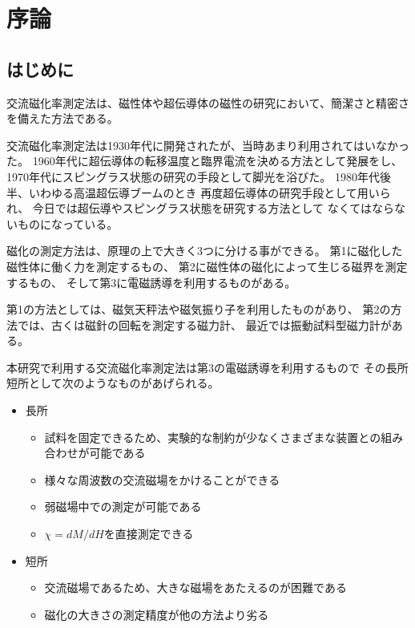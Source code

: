 \chapter{序論}\label{ch:joron}

\section{はじめに}\label{sec:hajimeni}
交流磁化率測定法は、磁性体や超伝導体の磁性の研究において、簡潔さと精密さを備えた方法である。

交流磁化率測定法は1930年代に開発されたが、当時あまり利用されてはいなかった。
1960年代に超伝導体の転移温度と臨界電流を決める方法として発展をし、
1970年代にスピングラス状態の研究の手段として脚光を浴びた。
1980年代後半、いわゆる高温超伝導ブームのとき
再度超伝導体の研究手段として用いられ、
今日では超伝導やスピングラス状態を研究する方法として
なくてはならないものになっている。

磁化の測定方法は、原理の上で大きく3つに分ける事ができる。
第1に磁化した磁性体に働く力を測定するもの、
第2に磁性体の磁化によって生じる磁界を測定するもの、
そして第3に電磁誘導を利用するものがある。

第1の方法としては、磁気天秤法や磁気振り子を利用したものがあり、
第2の方法では、古くは磁針の回転を測定する磁力計、
最近では振動試料型磁力計がある。

本研究で利用する交流磁化率測定法は第3の電磁誘導を利用するもので
その長所短所として次のようなものがあげられる。

\begin{itemize}
 \item 長所
  \begin{itemize}
    \item 試料を固定できるため、実験的な制約が少なくさまざまな装置との組み合わせが可能である
    \item 様々な周波数の交流磁場をかけることができる
    \item 弱磁場中での測定が可能である
    \item $\chi=dM/dH$を直接測定できる
  \end{itemize}
 \item 短所
  \begin{itemize}
    \item 交流磁場であるため、大きな磁場をあたえるのが困難である
    \item 磁化の大きさの測定精度が他の方法より劣る
  \end{itemize}
\end{itemize}

